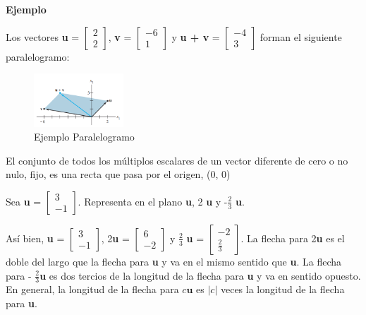 \documentclass{article}
\begin{document}
\begin{large}
    \textbf{Ejemplo}
\end{large}

Los vectores \textbf{u} = $\begin{bmatrix} 2\\2 \end{bmatrix}$, \textbf{v} = $\begin{bmatrix} -6\\1 \end{bmatrix}$ y \textbf{u + v} = $\begin{bmatrix} -4\\3 \end{bmatrix}$ forman el siguiente paralelogramo:

\begin{figure}[ht]
    \centerline{\includegraphics[width=0.3\textwidth]{image8.png}}
    \caption{Ejemplo Paralelogramo}
    \label{}
\end{figure}

El conjunto de todos los múltiplos escalares de un vector diferente de cero o no nulo, fijo, es una recta que pasa por el origen, (0, 0)

Sea \textbf{u} = $\begin{bmatrix} 3\\-1 \end{bmatrix}$. Representa en el plano \textbf{u}, 2 \textbf{u} y -$\frac{2}{3}$ \textbf{u}.

Así bien, \textbf{u} = $\begin{bmatrix} 3\\-1 \end{bmatrix}$, 2\textbf{u} = $\begin{bmatrix} 6\\-2 \end{bmatrix}$ y $\frac{2}{3}$ \textbf{u} = $\begin{bmatrix} -2\\ \frac{2}{3} \end{bmatrix}$. La flecha para 2\textbf{u} es el doble del largo que la flecha para \textbf{u} y va en el mismo sentido que \textbf{u}. La flecha para - $\frac{2}{3}$\textbf{u} es dos tercios de la longitud de la flecha para \textbf{u} y va en sentido opuesto. En general, la longitud de la flecha para $c\textbf{u}$ es $|c|$ veces la longitud de la flecha para \textbf{u}. 
\end{document}
